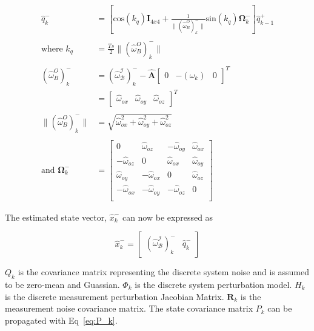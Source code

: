 \begin{equation}
	\begin{aligned}
		\hat{q}_k^- &= \left[\text{cos}(k_q)\mathbf{I}_{4x4} + \frac{1}{\lVert (\hat{\omega}_B^O)_k^- \rVert} \text{sin}(k_q) \mathbf{\Omega}_k^- \right] \hat{q}_{k-1}^+ \\ \\
		\text{where } k_q &= \frac{Ts}{2} \lVert (\hat{\omega}_B^O)_k^- \rVert \\ \\
		(\hat{\omega}_B^O)_k^- &= (\hat{\omega}_{\mathcal{B}}^{\mathcal{I}})_k^- - \hat{\boldsymbol{A}} \begin{bmatrix} 0 & -(\omega_k) & 0\end{bmatrix}^T \\
		&= \begin{bmatrix} \hat{\omega}_{ox} & \hat{\omega}_{oy}  & \hat{\omega}_{oz} \end{bmatrix}^T \\ \\
		\lVert (\hat{\omega}_B^O)_k^- \rVert &= \sqrt{\hat{\omega}_{ox}^2 + \hat{\omega}_{oy}^2 + \hat{\omega}_{oz}^2} \\ \\
		\text{and } \mathbf{\Omega}_k^- &= \begin{bmatrix} 
			0 & \hat{\omega}_{oz} & -\hat{\omega}_{oy} & \hat{\omega}_{ox} \\
			-\hat{\omega}_{oz} & 0 & \hat{\omega}_{ox} & \hat{\omega}_{oy}			\\
			\hat{\omega}_{oy} & -\hat{\omega}_{ox} & 0 & \hat{\omega}_{oz}			\\
			-\hat{\omega}_{ox} & -\hat{\omega}_{oy} & -\hat{\omega}_{oz} & 0			\\
		\end{bmatrix}
	\end{aligned}
	\label{eq:q-propagation}
\end{equation}

The estimated state vector, $\hat{x}_k^-$ can now be expressed as 

\begin{equation}
	\hat{x}_k^- = \begin{bmatrix} (\hat{\omega}_{\mathcal{B}}^{\mathcal{I}})_k^- & \hat{q}_k^-\end{bmatrix}
\end{equation}

$Q_k$ is the covariance matrix representing the discrete system noise and is assumed to be zero-mean and Guassian. $\Phi_k$ is the discrete system perturbation model. $H_k$ is the discrete measurement perturbation Jacobian Matrix. $\mathbf{R}_k$ is the measurement noise covariance matrix. The state covariance matrix $P_k$ can be propagated with Eq~\ref{eq:P_k}.

